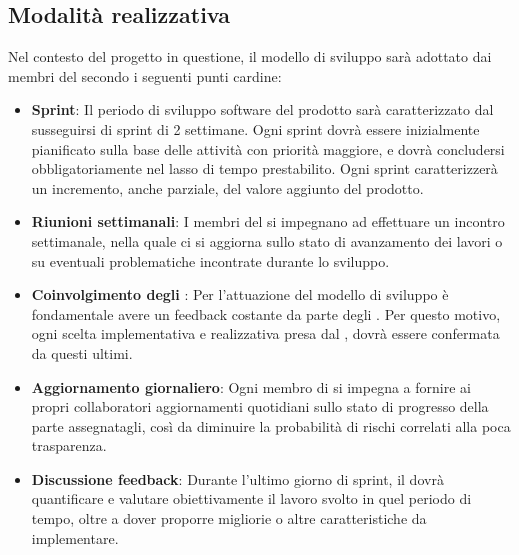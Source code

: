 \subsection{Modalità realizzativa}
Nel contesto del progetto in questione, il modello di sviluppo  sarà adottato dai membri
del  secondo i seguenti punti cardine:
\begin{itemize}
    \item \textbf{Sprint}: Il periodo di sviluppo software del prodotto sarà caratterizzato dal susseguirsi di sprint di 2 settimane. Ogni sprint dovrà essere inizialmente pianificato sulla base delle attività con priorità maggiore, e dovrà concludersi obbligatoriamente nel lasso di tempo prestabilito. Ogni sprint caratterizzerà un incremento, anche parziale, del valore aggiunto del prodotto.
    \item \textbf{Riunioni settimanali}: I membri del  si impegnano ad effettuare un incontro settimanale, nella quale ci si aggiorna sullo stato di avanzamento dei lavori o su eventuali problematiche incontrate durante lo sviluppo.
    \item \textbf{Coinvolgimento degli }: Per l’attuazione del modello di sviluppo  è fondamentale avere un feedback costante da parte degli . Per questo motivo, ogni scelta implementativa e realizzativa presa dal , dovrà essere confermata da questi ultimi.
    \item \textbf{Aggiornamento giornaliero}: Ogni membro di \gruppo{} si impegna a fornire ai propri collaboratori aggiornamenti quotidiani sullo stato di progresso della parte assegnatagli, così da diminuire la probabilità di rischi correlati alla poca trasparenza.
    \item \textbf{Discussione feedback}: Durante l’ultimo giorno di sprint, il  dovrà quantificare e valutare obiettivamente il lavoro svolto in quel periodo di tempo, oltre a dover proporre migliorie o altre caratteristiche da implementare.
\end{itemize}